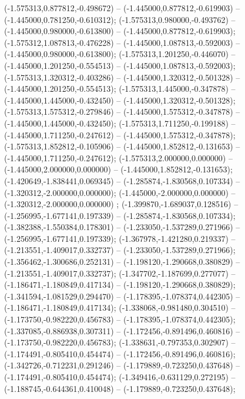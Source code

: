  (-1.575313,0.877812,-0.498672) -- (-1.445000,0.877812,-0.619903) -- (-1.445000,0.781250,-0.610312);
 (-1.575313,0.980000,-0.493762) -- (-1.445000,0.980000,-0.613800) -- (-1.445000,0.877812,-0.619903);
 (-1.575312,1.087813,-0.476228) -- (-1.445000,1.087813,-0.592003) -- (-1.445000,0.980000,-0.613800);
 (-1.575313,1.201250,-0.446070) -- (-1.445000,1.201250,-0.554513) -- (-1.445000,1.087813,-0.592003);
 (-1.575313,1.320312,-0.403286) -- (-1.445000,1.320312,-0.501328) -- (-1.445000,1.201250,-0.554513);
 (-1.575313,1.445000,-0.347878) -- (-1.445000,1.445000,-0.432450) -- (-1.445000,1.320312,-0.501328);
 (-1.575313,1.575312,-0.279846) -- (-1.445000,1.575312,-0.347878) -- (-1.445000,1.445000,-0.432450);
 (-1.575313,1.711250,-0.199188) -- (-1.445000,1.711250,-0.247612) -- (-1.445000,1.575312,-0.347878);
 (-1.575313,1.852812,-0.105906) -- (-1.445000,1.852812,-0.131653) -- (-1.445000,1.711250,-0.247612);
 (-1.575313,2.000000,0.000000) -- (-1.445000,2.000000,0.000000) -- (-1.445000,1.852812,-0.131653);
 (-1.420649,-1.838441,0.069345) -- (-1.285874,-1.830568,0.107334) -- (-1.320312,-2.000000,0.000000);
 (-1.445000,-2.000000,0.000000) -- (-1.320312,-2.000000,0.000000) ;
 (-1.399870,-1.689037,0.128516) -- (-1.256995,-1.677141,0.197339) -- (-1.285874,-1.830568,0.107334);
 (-1.382388,-1.550384,0.178301) -- (-1.233050,-1.537289,0.271966) -- (-1.256995,-1.677141,0.197339);
 (-1.367978,-1.421280,0.219337) -- (-1.213551,-1.409017,0.332737) -- (-1.233050,-1.537289,0.271966);
 (-1.356462,-1.300686,0.252131) -- (-1.198120,-1.290668,0.380829) -- (-1.213551,-1.409017,0.332737);
 (-1.347702,-1.187699,0.277077) -- (-1.186471,-1.180849,0.417134) -- (-1.198120,-1.290668,0.380829);
 (-1.341594,-1.081529,0.294470) -- (-1.178395,-1.078374,0.442305) -- (-1.186471,-1.180849,0.417134);
 (-1.338068,-0.981480,0.304510) -- (-1.173750,-0.982220,0.456783) -- (-1.178395,-1.078374,0.442305);
 (-1.337085,-0.886938,0.307311) -- (-1.172456,-0.891496,0.460816) -- (-1.173750,-0.982220,0.456783);
 (-1.338631,-0.797353,0.302907) -- (-1.174491,-0.805410,0.454474) -- (-1.172456,-0.891496,0.460816);
 (-1.342726,-0.712231,0.291246) -- (-1.179889,-0.723250,0.437648) -- (-1.174491,-0.805410,0.454474);
 (-1.349416,-0.631129,0.272195) -- (-1.188745,-0.644361,0.410048) -- (-1.179889,-0.723250,0.437648);

